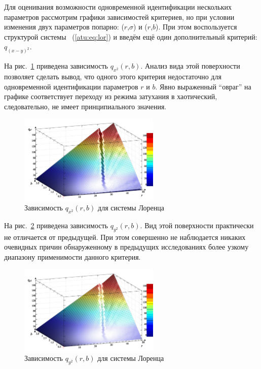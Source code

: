 Для оценивания возможности одновременной идентификации нескольких параметров
рассмотрим графики зависимостей критериев, но при условии
изменения двух параметров попарно: ($r$,$\sigma$) и ($r$,$b$).
При этом воспользуется структурой системы ~(\ref{atu:eq:lor})
и введём ещё один дополнительный критерий: $q_{(x-y)^2}$.

На рис.~\ref{atu:f:lor_qx2_r_b} приведена зависимость
$q_{x^2}(r,b)$.
Анализ вида этой поверхности позволяет сделать вывод,
что одного этого критерия недостаточно для
одновременной идентификации параметров $r$ и $b$.
Явно выраженный ``овраг'' на графике соответствует
переходу из режима затухания в хаотический,
следовательно, не имеет принципиального значения.

\begin{figure}[h!]
  \centerline{  \includegraphics[width=0.60\textwidth]{p/cha/lor/q2d/lor_qx2_r_b.png}  }
  \caption{Зависимость $q_{x^2}(r,b)$ для системы Лоренца}
  \label{atu:f:lor_qx2_r_b}
\end{figure}


На рис.~\ref{atu:f:lor_qy2_r_b} приведена зависимость
$q_{y^2}(r,b)$. Вид этой поверхности практически не отличается от предыдущей.
При этом совершенно не наблюдается никаких очевидных причин обнаруженному
в предыдущих исследованиях
более узкому диапазону применимости данного критерия.

\begin{figure}[h!]
  \centerline{  \includegraphics[width=0.60\textwidth]{p/cha/lor/q2d/lor_qy2_r_b.png}  }
  \caption{Зависимость $q_{y^2}(r,b)$ для системы Лоренца}
  \label{atu:f:lor_qy2_r_b}
\end{figure}

